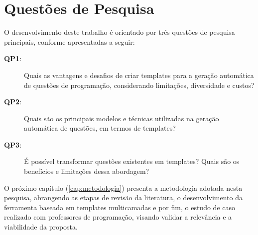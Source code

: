 \section{Questões de Pesquisa}

O desenvolvimento deste trabalho é orientado por três questões de pesquisa principais, conforme apresentadas a seguir:\\

\begin{description}
    \item[\textbf{QP1}:] Quais as vantagens e desafios de criar templates para a geração automática de questões de programação, considerando limitações, diversidade e custos?
    \item[\textbf{QP2}:] Quais são os principais modelos e técnicas utilizadas na geração automática de questões, em termos de templates?
    \item[\textbf{QP3}:] É possível transformar questões existentes em templates? Quais são os benefícios e limitações dessa abordagem?

\end{description}

O próximo capítulo (\autoref{cap:metodologia})  presenta a metodologia adotada nesta pesquisa, abrangendo as etapas de revisão da literatura, o desenvolvimento da ferramenta baseada em templates multicamadas e por fim, o estudo de caso realizado com professores de programação, visando validar a relevância e a viabilidade da proposta.  




